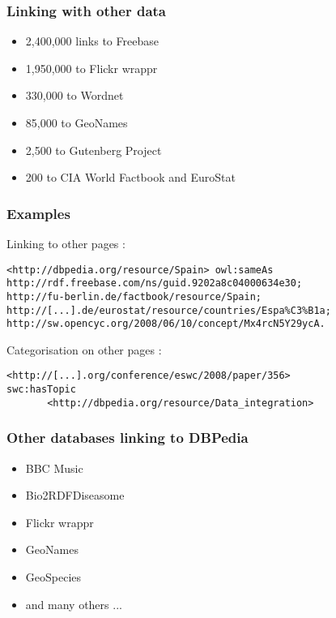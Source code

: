 \documentclass{beamer}
\begin{document}
\begin{frame}[fragile]
	\frametitle{Linking with other data}
	
	\begin{itemize}
	\item 2,400,000 links to Freebase
	\item 1,950,000 to Flickr wrappr
	\item 330,000 to Wordnet
	\item 85,000 to GeoNames
	\item 2,500 to Gutenberg Project
	\item 200 to CIA World Factbook and EuroStat
	\end{itemize}
	
\end{frame}

\begin{frame}[fragile]
	\frametitle{Examples}
		
	Linking to other pages :
	\begin{footnotesize}
	\begin{lstlisting}[frame=single]
	<http://dbpedia.org/resource/Spain> owl:sameAs
http://rdf.freebase.com/ns/guid.9202a8c04000634e30;
http://fu-berlin.de/factbook/resource/Spain;
http://[...].de/eurostat/resource/countries/Espa%C3%B1a;
http://sw.opencyc.org/2008/06/10/concept/Mx4rcN5Y29ycA.
	\end{lstlisting}
	\end{footnotesize}
	
	Categorisation on other pages :
	\begin{footnotesize}
	\begin{lstlisting}[frame=single]
<http://[...].org/conference/eswc/2008/paper/356>
swc:hasTopic 
       <http://dbpedia.org/resource/Data_integration>
	\end{lstlisting}
	\end{footnotesize}
\end{frame}

\begin{frame}[fragile]
	\frametitle{Other databases linking to DBPedia}

	\begin{itemize}
	\item BBC Music
	\item Bio2RDFDiseasome
	\item Flickr wrappr
	\item GeoNames
	\item GeoSpecies
	\item and many others ...
	\end{itemize}
	
\end{frame}
\end{document}
